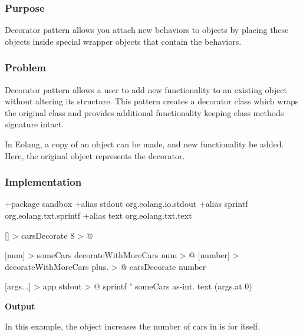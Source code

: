 \documentclass[12pt]{book}
\begin{document}
{{\subsubsection{Purpose}
Decorator pattern allows you attach new behaviors to objects by placing these objects inside special wrapper objects that contain the behaviors.

\subsubsection{Problem}
Decorator pattern allows a user to add new functionality to an existing object without altering its structure. This pattern creates a decorator class which wraps the original class and provides additional functionality keeping class methods signature intact.


In Eolang, a copy of an object can be made, and new functionality be added. Here, the original object represents the decorator.

\subsubsection{Implementation}
\begin{ffcode}
+package sandbox
+alias stdout org.eolang.io.stdout
+alias sprintf org.eolang.txt.sprintf
+alias text org.eolang.txt.text

[] > carsDecorate
  8 > @

[num] > someCars
  decorateWithMoreCars num > @
  [number] > decorateWithMoreCars
    plus. > @
      carsDecorate
      number

[args...] > app
  stdout > @
    sprintf
      "%
      someCars
        as-int.
          text (args.at 0)
\end{ffcode}
\textbf{Output}

In this example, the object  increases the number of cars in  is for itself.

}}
\end{document}

